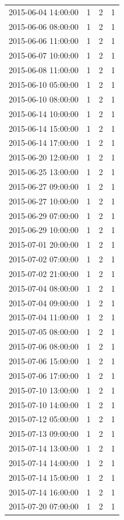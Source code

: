 \begin{tabular}{lrrr}
2015-06-04 14:00:00 & 1 & 2 & 1 \\
2015-06-06 08:00:00 & 1 & 2 & 1 \\
2015-06-06 11:00:00 & 1 & 2 & 1 \\
2015-06-07 10:00:00 & 1 & 2 & 1 \\
2015-06-08 11:00:00 & 1 & 2 & 1 \\
2015-06-10 05:00:00 & 1 & 2 & 1 \\
2015-06-10 08:00:00 & 1 & 2 & 1 \\
2015-06-14 10:00:00 & 1 & 2 & 1 \\
2015-06-14 15:00:00 & 1 & 2 & 1 \\
2015-06-14 17:00:00 & 1 & 2 & 1 \\
2015-06-20 12:00:00 & 1 & 2 & 1 \\
2015-06-25 13:00:00 & 1 & 2 & 1 \\
2015-06-27 09:00:00 & 1 & 2 & 1 \\
2015-06-27 10:00:00 & 1 & 2 & 1 \\
2015-06-29 07:00:00 & 1 & 2 & 1 \\
2015-06-29 10:00:00 & 1 & 2 & 1 \\
2015-07-01 20:00:00 & 1 & 2 & 1 \\
2015-07-02 07:00:00 & 1 & 2 & 1 \\
2015-07-02 21:00:00 & 1 & 2 & 1 \\
2015-07-04 08:00:00 & 1 & 2 & 1 \\
2015-07-04 09:00:00 & 1 & 2 & 1 \\
2015-07-04 11:00:00 & 1 & 2 & 1 \\
2015-07-05 08:00:00 & 1 & 2 & 1 \\
2015-07-06 08:00:00 & 1 & 2 & 1 \\
2015-07-06 15:00:00 & 1 & 2 & 1 \\
2015-07-06 17:00:00 & 1 & 2 & 1 \\
2015-07-10 13:00:00 & 1 & 2 & 1 \\
2015-07-10 14:00:00 & 1 & 2 & 1 \\
2015-07-12 05:00:00 & 1 & 2 & 1 \\
2015-07-13 09:00:00 & 1 & 2 & 1 \\
2015-07-14 13:00:00 & 1 & 2 & 1 \\
2015-07-14 14:00:00 & 1 & 2 & 1 \\
2015-07-14 15:00:00 & 1 & 2 & 1 \\
2015-07-14 16:00:00 & 1 & 2 & 1 \\
2015-07-20 07:00:00 & 1 & 2 & 1 \\

\end{tabular}
